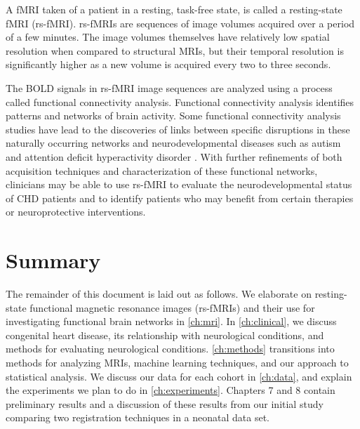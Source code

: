 A fMRI taken of a patient in a resting, task-free state, is called a resting-state fMRI (rs-fMRI). rs-fMRIs are sequences of image volumes acquired over a period of a few minutes. The image volumes themselves have relatively low spatial resolution when compared to structural MRIs, but their temporal resolution is significantly higher as a new volume is acquired every two to three seconds. 

The BOLD signals in rs-fMRI image sequences are analyzed using a process called functional connectivity analysis. Functional connectivity analysis identifies patterns and networks of brain activity. Some functional connectivity analysis studies have lead to the discoveries of links between specific disruptions in these naturally occurring networks and neurodevelopmental diseases such as autism and attention deficit hyperactivity disorder \cite{Assaf2010} \cite{Zang2007}. With further refinements of both acquisition techniques and characterization of these functional networks, clinicians may be able to use rs-fMRI to evaluate the neurodevelopmental status of CHD patients and to identify patients who may benefit from certain therapies or neuroprotective interventions.

\section{Summary}


The remainder of this document is laid out as follows. We elaborate on resting-state functional magnetic resonance images (rs-fMRIs) and their use for investigating functional brain networks in \ref{ch:mri}. In \ref{ch:clinical}, we discuss congenital heart disease, its relationship with neurological conditions, and methods for evaluating neurological conditions. \ref{ch:methods} transitions into methods for analyzing MRIs, machine learning techniques, and our approach to statistical analysis. We discuss our data for each cohort in \ref{ch:data}, and explain the experiments we plan to do in \ref{ch:experiments}. 
Chapters 7 and 8 contain preliminary results and a discussion of these results from our initial study comparing two registration techniques in a neonatal data set.